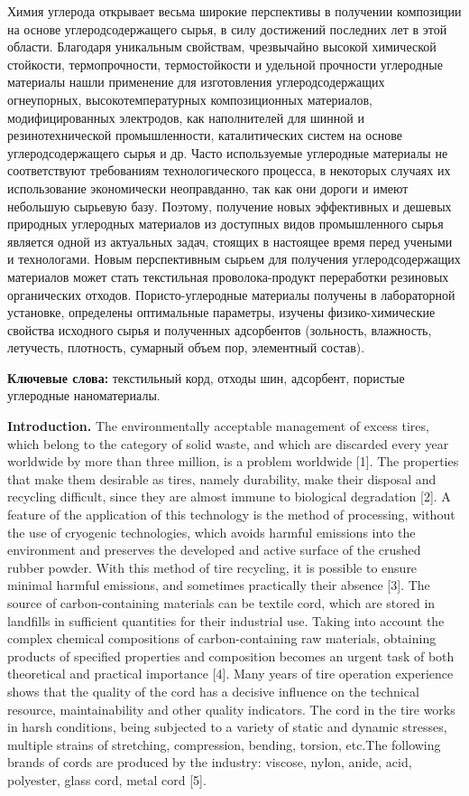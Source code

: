 Химия углерода открывает весьма широкие перспективы в получении
композиции на основе углеродсодержащего сырья, в силу достижений
последних лет в этой области. Благодаря уникальным свойствам,
чрезвычайно высокой химической стойкости, термопрочности, термостойкости
и удельной прочности углеродные материалы нашли применение для
изготовления углеродсодержащих огнеупорных, высокотемпературных
композиционных материалов, модифицированных электродов, как наполнителей
для шинной и резинотехнической промышленности, каталитических систем на
основе углеродсодержащего сырья и др. Часто используемые углеродные
материалы не соответствуют требованиям технологического процесса, в
некоторых случаях их использование экономически неоправданно, так как
они дороги и имеют небольшую сырьевую базу. Поэтому, получение новых
эффективных и дешевых природных углеродных материалов из доступных видов
промышленного сырья является одной из актуальных задач, стоящих в
настоящее время перед учеными и технологами. Новым перспективным сырьем
для получения углеродсодержащих материалов может стать текстильная
проволока-продукт переработки резиновых органических отходов.
Пористо-углеродные материалы получены в лабораторной установке,
определены оптимальные параметры, изучены физико-химические свойства
исходного сырья и полученных адсорбентов (зольность, влажность,
летучесть, плотность, сумарный объем пор, элементный состав).

\textbf{Ключевые слова:} текстильный корд, отходы шин, адсорбент,
пористые углеродные наноматериалы.

\textbf{Introduction.} The environmentally acceptable management of
excess tires, which belong to the category of solid waste, and which are
discarded every year worldwide by more than three million, is a problem
worldwide {[}1{]}. The properties that make them desirable as tires,
namely durability, make their disposal and recycling difficult, since
they are almost immune to biological degradation {[}2{]}. A feature of
the application of this technology is the method of processing, without
the use of cryogenic technologies, which avoids harmful emissions into
the environment and preserves the developed and active surface of the
crushed rubber powder. With this method of tire recycling, it is
possible to ensure minimal harmful emissions, and sometimes practically
their absence {[}3{]}. The source of carbon-containing materials can be
textile cord, which are stored in landfills in sufficient quantities for
their industrial use. Taking into account the complex chemical
compositions of carbon-containing raw materials, obtaining products of
specified properties and composition becomes an urgent task of both
theoretical and practical importance {[}4{]}. Many years of tire
operation experience shows that the quality of the cord has a decisive
influence on the technical resource, maintainability and other quality
indicators. The cord in the tire works in harsh conditions, being
subjected to a variety of static and dynamic stresses, multiple strains
of stretching, compression, bending, torsion, etc.The following brands
of cords are produced by the industry: viscose, nylon, anide, acid,
polyester, glass cord, metal cord {[}5{]}.

